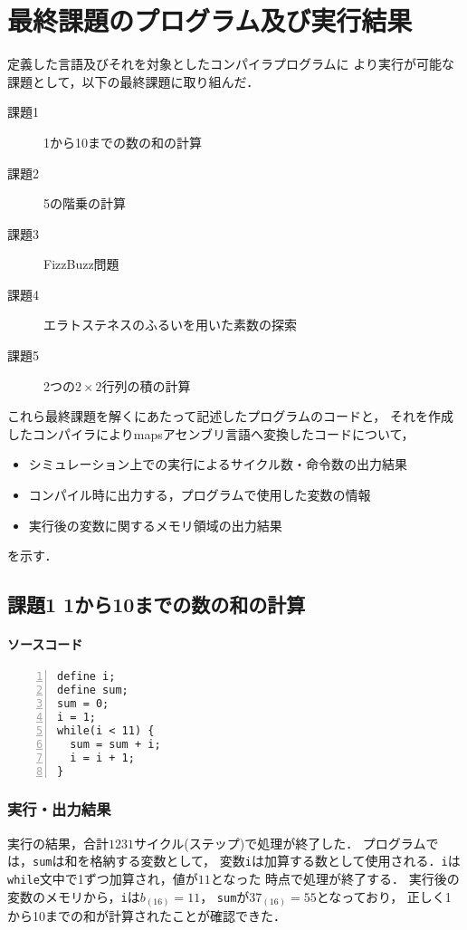 \section{最終課題のプログラム及び実行結果}
定義した言語及びそれを対象としたコンパイラプログラムに
より実行が可能な課題として，以下の最終課題に取り組んだ．
\begin{description}
  \item[課題1] 1から10までの数の和の計算
  \item[課題2] 5の階乗の計算
  \item[課題3] FizzBuzz問題
  \item[課題4] エラトステネスのふるいを用いた素数の探索
  \item[課題5] 2つの$2 \times 2$行列の積の計算 
\end{description}

これら最終課題を解くにあたって記述したプログラムのコードと，
それを作成したコンパイラによりmapsアセンブリ言語へ変換したコードについて，
\begin{itemize}
  \item シミュレーション上での実行によるサイクル数・命令数の出力結果
  \item コンパイル時に出力する，プログラムで使用した変数の情報
  \item 実行後の変数に関するメモリ領域の出力結果
\end{itemize}
を示す．

\subsection{課題1 1から10までの数の和の計算}

\paragraph*{ソースコード}

\begin{Verbatim}[numbers=left, xleftmargin=10mm, numbersep=6pt, frame=single,
                    fontsize=\small, baselinestretch=0.8]
define i;
define sum;
sum = 0;
i = 1;
while(i < 11) {
  sum = sum + i;
  i = i + 1;
}
\end{Verbatim}

\subsubsection{実行・出力結果}
実行の結果，合計$1231$サイクル(ステップ)で処理が終了した．
プログラムでは，\verb|sum|は和を格納する変数として，
変数\verb|i|は加算する数として使用される．\verb|i|は
\verb|while|文中で1ずつ加算され，値が$11$となった
時点で処理が終了する．
実行後の変数のメモリから，\verb|i|は$b_{(16)} = 11$，
\verb|sum|が$37_{(16)} = 55$となっており，
正しく1から10までの和が計算されたことが確認できた．

